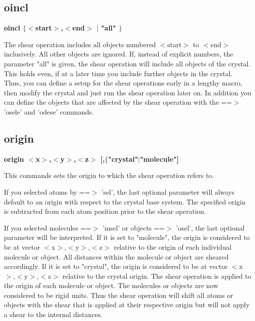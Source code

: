 \subsection*{oincl}
{\bf oincl $ \{$$ <$start$> $,$ <$end$> $ $| $ "all" $\} $ \par }
\par
\vspace{3pt}
The shear operation includes all objects numbered $ <$start$> $ to $ <$end$> $ 
inclusively. All other objects are ignored. 
If, instead of explicit numbers, the parameter "all" is given, the 
shear operation will include all objects of the crystal. This holds 
even, if at a later time you include further objects in the crystal. 
Thus, you can define a setup for the shear operations early in a 
lengthy macro, then modify the crystal and just run the shear 
operation later on. 
In addition you can define the objects that are affected by the 
shear operation with the ==$> $'osele' and 'odese' commands. 
\subsection*{origin}
{\bf origin $ <$x$> $,$ <$y$> $,$ <$z$> $ [,$ \{$"crystal"$| $"molecule"] \par }
\par
\vspace{3pt}
This commands sets the origin to which the shear operation refers to. 
\par
If you selected atoms by ==$> $ 'sel', the last optional parameter will 
always default to an origin with respect to the crystal base system. 
The specified origin is subtracted from each atom position prior to the 
shear operation. 
\par
If you selected molecules ==$> $ 'msel' or objects ==$> $ 'osel', the last 
optional parameter will be interpreted. 
If it is set to "molecule", the origin is considered to be at vector 
$ <$x$> $,$ <$y$> $,$ <$z$> $ relative to the origin of each individual molecule or 
object. All distances within the molecule or object are sheared 
accordingly. 
If it is set to "crystal", the origin is considered to be at vector 
$ <$x$> $,$ <$y$> $,$ <$z$> $ relative to the crystal origin. The shear operation is 
applied to the origin of each molecule or object. The molecules or 
objects are now considered to be rigid units. Thus the shear operation 
will shift all atoms or objects with the shear that is applied at their 
respective origin but will not apply a shear to the internal distances. 
